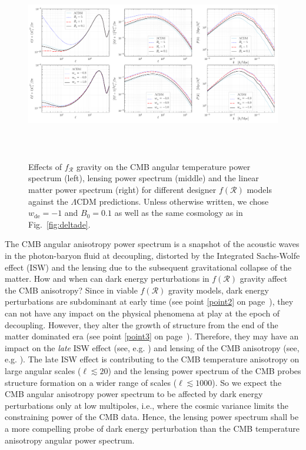 \documentclass[nofootinbib,a4paper,aps,prd,10pt,superscriptaddress,reprint,showkeys,showpacs]{revtex4-1}
\newcommand{\qsubrm}[2]{{#1}_{\scriptscriptstyle{\textrm{#2}}}}
\begin{document}
\begin{figure}
 \begin{center}
  \includegraphics[height=8.5cm,angle=0]{fig3.pdf}
  \caption[adjust]{Effects of $f_{\mathcal{R}}$ gravity on the CMB angular temperature power spectrum (left), lensing 
  power spectrum (middle) and the linear matter power spectrum (right) for different designer $f(\mathcal{R})$ models 
  against the $\Lambda$CDM predictions. Unless otherwise written, we chose $\qsubrm{w}{de}=-1$ and $\qsubrm{B}{0}=0.1$ 
  as well as the same cosmology as in Fig.~\ref{fig:deltade}.}
  \label{fig:obs}
 \end{center}
\end{figure}

The CMB angular anisotropy power spectrum is a snapshot of the acoustic waves in the photon-baryon fluid at decoupling, 
distorted by the Integrated Sachs-Wolfe effect (ISW) and the lensing due to the subsequent gravitational collapse of 
the matter. How and when can dark energy perturbations in $f(\mathcal{R})$ gravity affect the CMB anisotropy? 
Since in viable $f(\mathcal{R})$ gravity models, dark energy perturbations are subdominant at early time (see point 
\ref{point2} on page~\pageref{point2}), they can not have any impact on the physical phenomena at play at the epoch of 
decoupling. However, they alter the growth of structure from the end of the matter dominated era (see point 
\ref{point3} on page~\pageref{point3}). Therefore, they may have an impact on the \textit{late} ISW effect (see, e.g. 
\citep{Lesgourgues2013}) and lensing of the CMB anisotropy (see, e.g. \citep{Lewis2006}). The late ISW effect is 
contributing to the CMB temperature anisotropy on large angular scales ($\ell\lesssim 20$) and the lensing power 
spectrum of the CMB probes structure formation on a wider range of scales ($\ell\lesssim 1000$). So we expect the CMB 
angular anisotropy power spectrum to be affected by dark energy perturbations only at low multipoles, i.e., where the 
cosmic variance limits the constraining power of the CMB data. Hence, the lensing power spectrum shall be a more 
compelling probe of dark energy perturbation than the CMB temperature anisotropy angular power spectrum.
\end{document}
